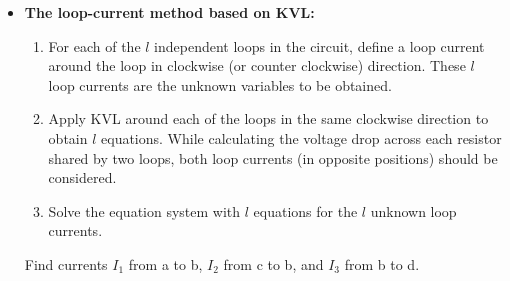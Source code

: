 \begin{itemize}
\begin{comment}
  Note that equations from KCL at node d and KVL to other loops are not
  independent. In general, if a circuit has n nodes and b branches, then
  there are $(n-1)$ independent node equations and $l=b-(n-1)$ independent 
  loop equations. In other words, the sum of the number of independent loops
  and the number of independent nodes is always the same as the number of 
  branches, i.e., the number of equations is always equal to the number of 
  unknowns in the branch current method.
\end{comment}

\item {\bf The loop-current method based on KVL:}
  \begin{enumerate} 
  \item For each of the $l$ independent loops in the circuit, define a 
    loop current around the loop in clockwise (or counter clockwise)
    direction. These $l$ loop currents are the unknown variables to
    be obtained.
  \item Apply KVL around each of the loops in the same clockwise 
    direction to obtain $l$ equations. While calculating the voltage 
    drop across each resistor shared by two loops, both loop currents 
    (in opposite positions) should be considered.
  \item Solve the equation system with $l$ equations for the $l$ unknown
    loop currents.
  \end{enumerate}
  

  Find currents $I_1$ from a to b, $I_2$ from c to b, and $I_3$ from 
  b to d.

  \begin{itemize}


\end{itemize}
\end{itemize}
